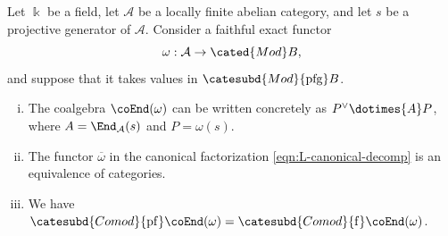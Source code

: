 \begin{lemma}\label{prop:Tannaka-projective-generator}
	Let $\Bbbk$ be a field, let $\mathcal{A}$ be a locally finite abelian
	category, and let $s$ be a projective generator of $\mathcal{A}$. Consider
	a faithful exact functor
	\[ \omega: \mathcal{A} \to \cated{Mod}B, \]
	and suppose that it takes values in
	$\catesubd{Mod}{\mathrm{pfg}}B$.
	\begin{enumerate}[(i)]
		\item The coalgebra $\coEnd(\omega)$ can be written concretely as
		$P^\vee\dotimes{A}P$, where
		$A=\End_{\mathcal{A}}(s)$ and $P=\omega(s)$.
		\item The functor $\overline\omega$ in the canonical factorization
		\eqref{eqn:L-canonical-decomp} is an equivalence of categories.
		\item We have
		$\catesubd{Comod}{\mathrm{pf}}\coEnd(\omega)=
		\catesubd{Comod}{\mathrm f}\coEnd(\omega)$.
	\end{enumerate}
\end{lemma}
